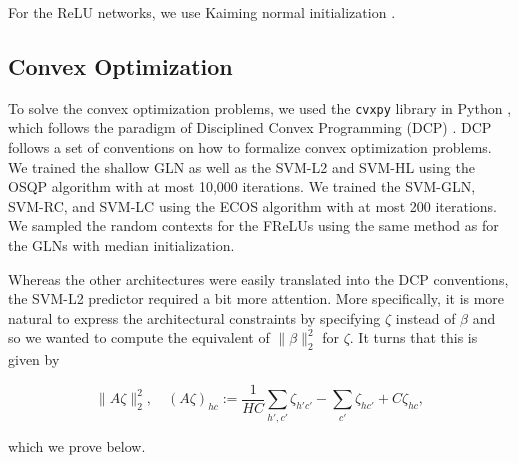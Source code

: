 \documentclass{article}
\theoremstyle{plain}
\theoremstyle{definition}
\theoremstyle{remark}
\begin{document}
For the ReLU networks, we use Kaiming normal initialization \citep{he_delving_2015}.

\subsection{Convex Optimization}
\label{sec:cp}
To solve the convex optimization problems, we used the \texttt{cvxpy} library in Python \citep{diamond_cvxpy_2016,agrawal_rewriting_2018}, which follows the paradigm of Disciplined Convex Programming (DCP) \citep{grant_disciplined_2006}.
DCP follows a set of conventions on how to formalize convex optimization problems.
We trained the shallow GLN as well as the SVM-L2 and SVM-HL using the OSQP algorithm \citep{stellato_osqp_2020} with at most 10,000 iterations.
We trained the SVM-GLN, SVM-RC, and SVM-LC using the ECOS algorithm \citep{domahidi_ecos_2013} with at most 200 iterations.
We sampled the random contexts for the FReLUs using the same method as for the GLNs with median initialization.

Whereas the other architectures were easily translated into the DCP conventions, the SVM-L2 predictor required a bit more attention.
More specifically, it is more natural to express the architectural constraints by specifying $\zeta$ instead of $\beta$ and so we wanted to compute the equivalent of $\|\beta\|_2^2$ for $\zeta$.
It turns that this is given by

\begin{equation}
    \|A\zeta\|_2^2,\quad
    (A\zeta)_{hc}:=\frac{1}{HC}\sum_{h',c'}\zeta_{h'c'}-\sum_{c'}\zeta_{hc'}+C\zeta_{hc},
\end{equation}

which we prove below.
\end{document}
